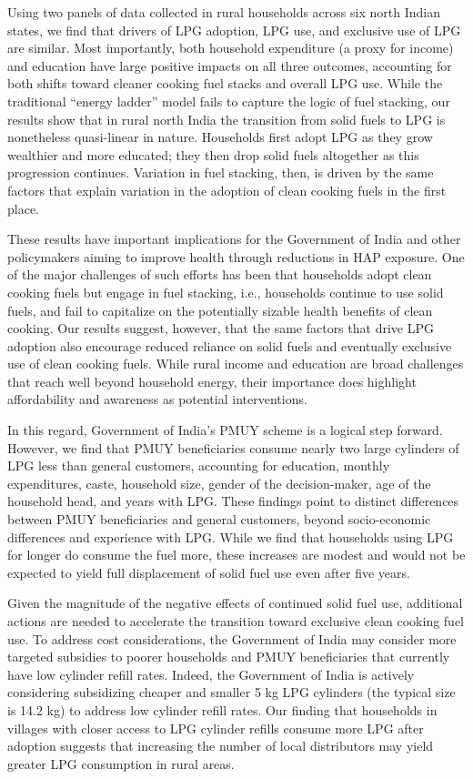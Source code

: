 \documentclass[11pt,english]{article}
\theoremstyle{plain} \newtheorem{claim}{Claim}
\theoremstyle{plain} \newtheorem{prop}{Proposition}
\theoremstyle{plain} \newtheorem{hypo}{Hypothesis}
\begin{document}
Using two panels of data collected in rural households across six north Indian states, we find that drivers of LPG adoption, LPG use, and exclusive use of LPG are similar. Most importantly, both household expenditure (a proxy for income) and education have large positive impacts on all three outcomes, accounting for both shifts toward cleaner cooking fuel stacks and overall LPG use. While the traditional ``energy ladder'' model\citep{Leach1992} fails to capture the logic of fuel stacking, our results show that in rural north India the transition from solid fuels to LPG is nonetheless quasi-linear in nature. Households first adopt LPG as they grow wealthier and more educated; they then drop solid fuels altogether as this progression continues. Variation in fuel stacking, then, is driven by the same factors that explain variation in the adoption of clean cooking fuels in the first place.

These results have important implications for the Government of India and other policymakers aiming to improve health through reductions in HAP exposure. One of the major challenges of such efforts has been that households adopt clean cooking fuels but engage in fuel stacking, i.e., households continue to use solid fuels, and fail to capitalize on the potentially sizable health benefits of clean cooking. Our results suggest, however, that the same factors that drive LPG adoption also encourage reduced reliance on solid fuels and eventually exclusive use of clean cooking fuels. While rural income and education are broad challenges that reach well beyond household energy, their importance does highlight affordability and awareness as potential interventions. 

In this regard, Government of India's PMUY scheme is a logical step forward. However, we find that PMUY beneficiaries consume nearly two large cylinders of LPG less than general customers, accounting for education, monthly expenditures, caste, household size, gender of the decision-maker, age of the household head, and years with LPG. These findings point to distinct differences between PMUY beneficiaries and general customers, beyond socio-economic differences and experience with LPG. While we find that households using LPG for longer do consume the fuel more, these increases are modest and would not be expected to yield full displacement of solid fuel use even after five years.

Given the magnitude of the negative effects of continued solid fuel use, additional actions are needed to accelerate the transition toward exclusive clean cooking fuel use. To address cost considerations, the Government of India may consider more targeted subsidies to poorer households and PMUY beneficiaries that currently have low cylinder refill rates. Indeed, the Government of India is actively considering subsidizing cheaper and smaller 5 kg LPG cylinders (the typical size is 14.2 kg) to address low cylinder refill rates. Our finding that households in villages with closer access to LPG cylinder refills consume more LPG after adoption suggests that increasing the number of local distributors may yield greater LPG consumption in rural areas.
\end{document}
